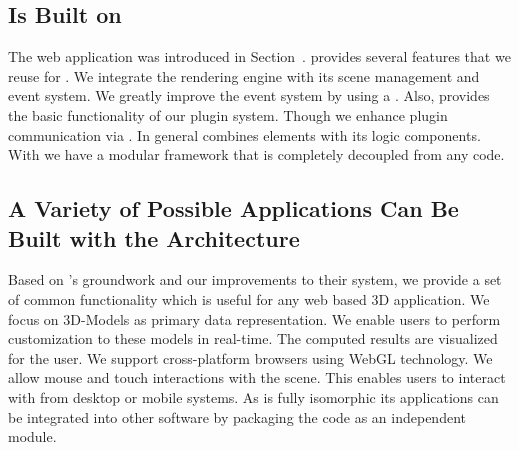 \documentclass[../../ClassicThesis.tex]{subfiles}
\begin{document}


\subsection{{\convertify} Is Built on {\brickify}}
\label{sec:brickify-comparison}

The web application {\brickify} was introduced in
Section~. {\brickify} provides several
features that we reuse for {\convertify}. We integrate the
rendering engine with its scene management and event system.
We greatly improve the event system by using a
. Also, {\brickify} provides the basic
functionality of our plugin system. Though we enhance plugin
communication via . In general {\brickify}
combines {\userinterface} elements with its logic
components. With {\convertify} we have a modular framework
that is completely decoupled from any {\userinterface} code.

\subsection{A Variety of Possible Applications Can Be Built with the {\convertify} Architecture}
\label{sec:variety-of-applications}

Based on {\brickify}'s groundwork and our improvements to
their system, we provide a set of common functionality which
is useful for any web based 3D application. We focus on
3D-Models as primary data representation. We enable users to
perform customization to these models in real-time. The
computed results are visualized for the user. We support
cross-platform browsers using WebGL technology. We allow
mouse and touch interactions with the scene. This enables
users to interact with {\convertify} from desktop or mobile
systems. As {\convertify} is fully isomorphic its
applications can be integrated into other software by
packaging the code as an independent {\nodejs} module.
\end{document}
